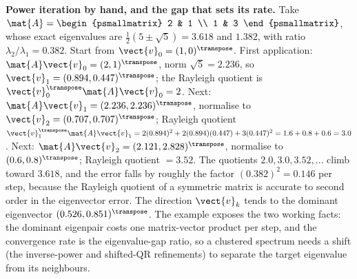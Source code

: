 \begin{example}
\textbf{Power iteration by hand, and the gap that sets its rate.} Take
$\mat{A} = \begin{psmallmatrix} 2 & 1 \\ 1 & 3 \end{psmallmatrix}$, whose exact
eigenvalues are $\tfrac{1}{2}(5 \pm \sqrt{5}) = 3.618$ and $1.382$, with ratio
$\lambda_{2}/\lambda_{1} = 0.382$. Start from $\vect{v}_{0} = (1, 0)^{\transpose}$.
First application: $\mat{A}\vect{v}_{0} = (2, 1)^{\transpose}$, norm
$\sqrt{5} = 2.236$, so $\vect{v}_{1} = (0.894, 0.447)^{\transpose}$; the
Rayleigh quotient is $\vect{v}_{0}^{\transpose}\mat{A}\vect{v}_{0} = 2$. Next:
$\mat{A}\vect{v}_{1} = (2.236, 2.236)^{\transpose}$, normalise to $\vect{v}_{2}
= (0.707, 0.707)^{\transpose}$; Rayleigh quotient $\vect{v}_{1}^{\transpose}
\mat{A}\vect{v}_{1} = 2(0.894)^{2} + 2(0.894)(0.447) + 3(0.447)^{2} = 1.6 +
0.8 + 0.6 = 3.0$. Next: $\mat{A}\vect{v}_{2} = (2.121, 2.828)^{\transpose}$,
normalise to $(0.6, 0.8)^{\transpose}$; Rayleigh quotient $= 3.52$. The
quotients $2.0, 3.0, 3.52, \ldots$ climb toward $3.618$, and the error falls
by roughly the factor $(0.382)^{2} = 0.146$ per step, because the Rayleigh
quotient of a symmetric matrix is accurate to second order in the eigenvector
error. The direction $\vect{v}_{k}$ tends to the dominant eigenvector
$(0.526, 0.851)^{\transpose}$. The example exposes the two working facts: the
dominant eigenpair costs one matrix-vector product per step, and the
convergence rate is the eigenvalue-gap ratio, so a clustered spectrum needs a
shift (the inverse-power and shifted-QR refinements) to separate the target
eigenvalue from its neighbours.
\end{example}

